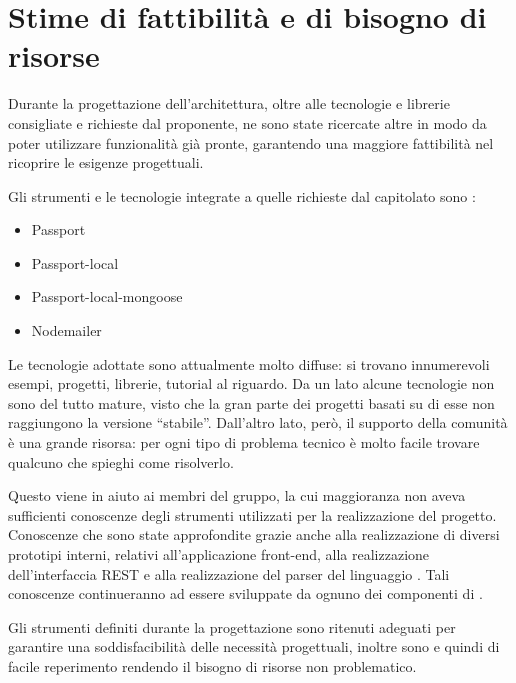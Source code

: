 \section{Stime di fattibilità e di bisogno di risorse}

Durante la progettazione dell'architettura, oltre alle tecnologie e librerie consigliate e richieste dal proponente, ne sono state ricercate altre in modo da poter utilizzare funzionalità già pronte, garantendo una maggiore fattibilità nel ricoprire le esigenze progettuali.

Gli strumenti e le tecnologie integrate a quelle richieste dal capitolato sono : 
\begin{itemize}
\item Passport
\item Passport-local
\item Passport-local-mongoose
\item Nodemailer
\end{itemize}

Le tecnologie adottate sono attualmente molto diffuse: si trovano innumerevoli esempi, progetti, librerie, tutorial al riguardo. Da un lato alcune tecnologie non sono del tutto mature, visto che la gran parte dei progetti basati su di esse non raggiungono la versione ``stabile''. Dall'altro lato, però, il supporto della comunità è una grande risorsa: per ogni tipo di problema tecnico è molto facile trovare qualcuno che spieghi come risolverlo.

Questo viene in aiuto ai membri del gruppo, la cui maggioranza non aveva sufficienti conoscenze degli strumenti utilizzati per la realizzazione del progetto. Conoscenze che sono state approfondite grazie anche alla realizzazione di diversi prototipi interni, relativi all'applicazione front-end, alla realizzazione dell'interfaccia REST e alla realizzazione del parser del linguaggio . Tali conoscenze continueranno ad essere sviluppate da ognuno dei componenti di \GroupName{}.

Gli strumenti definiti durante la progettazione sono ritenuti adeguati per garantire una soddisfacibilità delle necessità progettuali, inoltre sono  e quindi di facile reperimento rendendo il bisogno di risorse non problematico.

